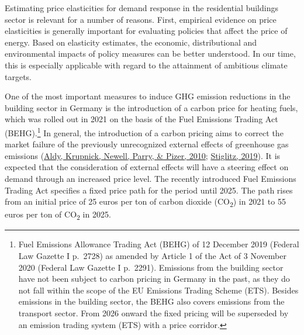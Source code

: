 \documentclass[12pt,twoside]{reedthesis}
\begin{document}
Estimating price elasticities for demand response in the residential buildings sector is relevant for a number of reasons. First, empirical evidence on price elasticities is generally important for evaluating policies that affect the price of energy. Based on elasticity estimates, the economic, distributional and environmental impacts of policy measures can be better understood. In our time, this is especially applicable with regard to the attainment of ambitious climate targets.

One of the most important measures to induce GHG emission reductions in the building sector in Germany is the introduction of a carbon price for heating fuels, which was rolled out in 2021 on the basis of the Fuel Emissions Trading Act (BEHG).\footnote{Fuel Emissions Allowance Trading Act (BEHG) of 12 December 2019 (Federal Law Gazette I p.~2728) as amended by Article 1 of the Act of 3 November 2020 (Federal Law Gazette I p.~2291). Emissions from the building sector have not been subject to carbon pricing in Germany in the past, as they do not fall within the scope of the EU Emissions Trading Scheme (ETS). Besides emissions in the building sector, the BEHG also covers emissions from the transport sector. From 2026 onward the fixed pricing will be superseded by an emission trading system (ETS) with a price corridor.} In general, the introduction of a carbon pricing aims to correct the market failure of the previously unrecognized external effects of greenhouse gas emissions (\protect\hyperlink{ref-aldy_etal10}{Aldy, Krupnick, Newell, Parry, \& Pizer, 2010}; \protect\hyperlink{ref-stiglitz19}{Stiglitz, 2019}). It is expected that the consideration of external effects will have a steering effect on demand through an increased price level. The recently introduced Fuel Emissions Trading Act specifies a fixed price path for the period until 2025. The path rises from an initial price of 25 euros per ton of carbon dioxide (CO\textsubscript{2}) in 2021 to 55 euros per ton of CO\textsubscript{2} in 2025.
\end{document}
